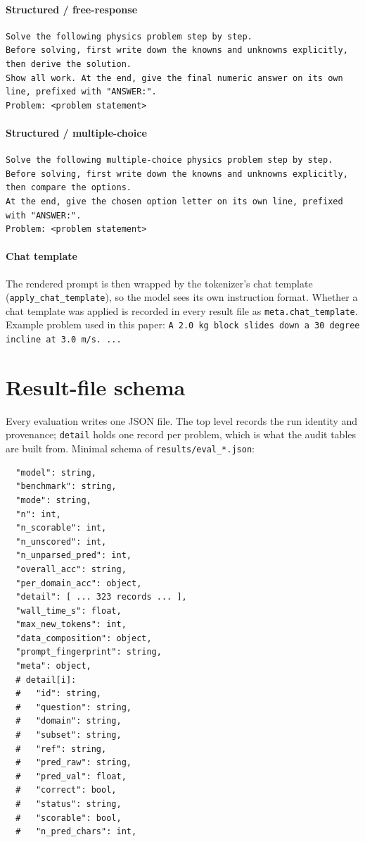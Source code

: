 \paragraph{Structured / free-response}
{\footnotesize\begin{verbatim}  
Solve the following physics problem step by step.
Before solving, first write down the knowns and unknowns explicitly, then derive the solution.
Show all work. At the end, give the final numeric answer on its own line, prefixed with "ANSWER:".
Problem: <problem statement>
\end{verbatim}}
\paragraph{Structured / multiple-choice}
{\footnotesize\begin{verbatim}  
Solve the following multiple-choice physics problem step by step.
Before solving, first write down the knowns and unknowns explicitly, then compare the options.
At the end, give the chosen option letter on its own line, prefixed with "ANSWER:".
Problem: <problem statement>
\end{verbatim}}
\paragraph{Chat template}
The rendered prompt is then wrapped by the tokenizer's chat template
(\texttt{apply\_chat\_template}), so the model sees its own instruction format.
Whether a chat template was applied is recorded in every result file as
\texttt{meta.chat\_template}.
Example problem used in this paper: \texttt{A 2.0 kg block slides down a 30 degree incline at 3.0 m/s. ...}

\section{Result-file schema}
\label{app:schema}
Every evaluation writes one JSON file. The top level records the run identity and
provenance; \texttt{detail} holds one record per problem, which is what the audit
tables are built from. Minimal schema of \texttt{results/eval\_*.json}:

\begin{verbatim}
  "model": string,
  "benchmark": string,
  "mode": string,
  "n": int,
  "n_scorable": int,
  "n_unscored": int,
  "n_unparsed_pred": int,
  "overall_acc": string,
  "per_domain_acc": object,
  "detail": [ ... 323 records ... ],
  "wall_time_s": float,
  "max_new_tokens": int,
  "data_composition": object,
  "prompt_fingerprint": string,
  "meta": object,
  # detail[i]:
  #   "id": string,
  #   "question": string,
  #   "domain": string,
  #   "subset": string,
  #   "ref": string,
  #   "pred_raw": string,
  #   "pred_val": float,
  #   "correct": bool,
  #   "status": string,
  #   "scorable": bool,
  #   "n_pred_chars": int,
\end{verbatim}

